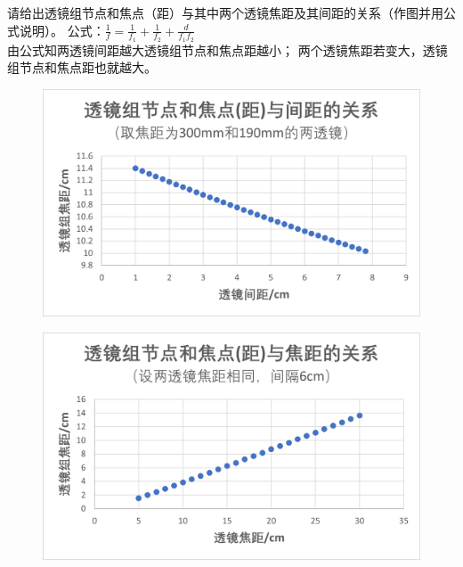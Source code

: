 \documentclass[dvipsnames, svgnames,a4paper,11pt]{article}
\begin{document}
\begin{question}
	请给出透镜组节点和焦点（距）与其中两个透镜焦距及其间距的关系（作图并用公式说明）。
	\tcblower
	公式：$\frac{1}{f}=\frac{1}{f_1}+\frac{1}{f_2}+\frac{d}{f_1f_2}$\\
	由公式知两透镜间距越大透镜组节点和焦点距越小；
	两个透镜焦距若变大，透镜组节点和焦点距也就越大。
	\begin{figure}[H]
		\centering
		\includegraphics[width=\textwidth]{透镜组1.png}
	\end{figure}
	\begin{figure}[H]
		\centering
		\includegraphics[width=\textwidth]{透镜组2.png}
	\end{figure}
\end{question}
\clearpage
%
%
\end{document}
